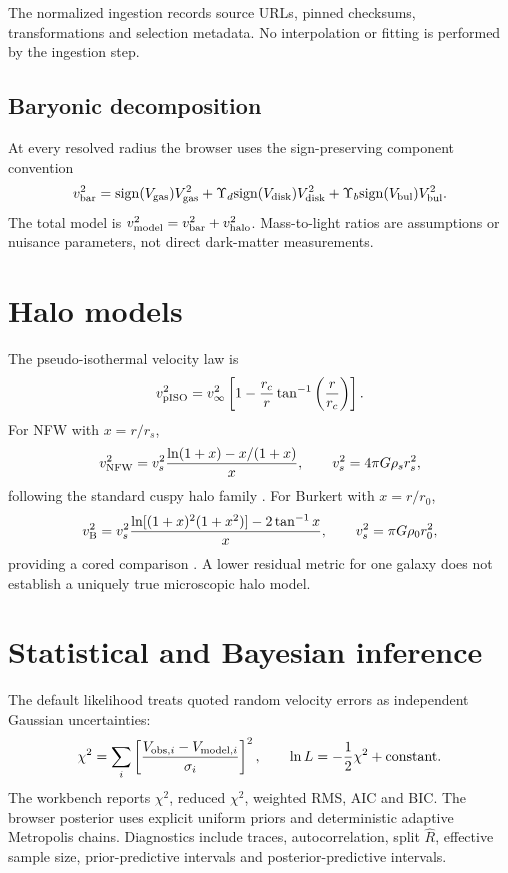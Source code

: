 \documentclass[11pt,a4paper]{article}
\begin{document}
The normalized ingestion records source URLs, pinned checksums, transformations and selection metadata. No interpolation or fitting is performed by the ingestion step.

\subsection{Baryonic decomposition}
At every resolved radius the browser uses the sign-preserving component convention
\begin{equation}
v_{\rm bar}^2={\rm sign}(V_{\rm gas})V_{\rm gas}^2+\Upsilon_d{\rm sign}(V_{\rm disk})V_{\rm disk}^2+\Upsilon_b{\rm sign}(V_{\rm bul})V_{\rm bul}^2.
\end{equation}
The total model is $v_{\rm model}^2=v_{\rm bar}^2+v_{\rm halo}^2$. Mass-to-light ratios are assumptions or nuisance parameters, not direct dark-matter measurements.

\section{Halo models}
The pseudo-isothermal velocity law is
\begin{equation}
v_{\rm pISO}^2=v_\infty^2\left[1-\frac{r_c}{r}\tan^{-1}\left(\frac{r}{r_c}\right)\right].
\end{equation}
For NFW with $x=r/r_s$,
\begin{equation}
v_{\rm NFW}^2=v_s^2\frac{\ln(1+x)-x/(1+x)}{x},\qquad v_s^2=4\pi G\rho_s r_s^2,
\end{equation}
following the standard cuspy halo family \parencite{NFW1996}. For Burkert with $x=r/r_0$,
\begin{equation}
v_{\rm B}^2=v_s^2\frac{\ln[(1+x)^2(1+x^2)]-2\tan^{-1}x}{x},\qquad v_s^2=\pi G\rho_0r_0^2,
\end{equation}
providing a cored comparison \parencite{Burkert1995}. A lower residual metric for one galaxy does not establish a uniquely true microscopic halo model.

\section{Statistical and Bayesian inference}
The default likelihood treats quoted random velocity errors as independent Gaussian uncertainties:
\begin{equation}
\chi^2=\sum_i\left[\frac{V_{{\rm obs},i}-V_{{\rm model},i}}{\sigma_i}\right]^2,\qquad \ln L=-\frac{1}{2}\chi^2+{\rm constant}.
\end{equation}
The workbench reports $\chi^2$, reduced $\chi^2$, weighted RMS, AIC and BIC. The browser posterior uses explicit uniform priors and deterministic adaptive Metropolis chains. Diagnostics include traces, autocorrelation, split $\hat R$, effective sample size, prior-predictive intervals and posterior-predictive intervals.
\end{document}

